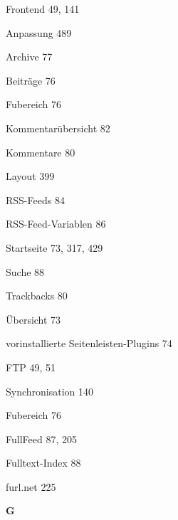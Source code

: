 \documentclass{book}
\renewcommand\indexspace{\vspace{11pt}}
\renewcommand\subitem{\par}
\begin{document}
\begin{multicols}{2}
\begin{osp-index}
  \item Frontend\hspace{1mm} 49, 141
    \subitem Anpassung\hspace{1mm} 489
    \subitem Archive\hspace{1mm} 77
    \subitem Beitr\"age\hspace{1mm} 76
    \subitem Fu\IeC {\ss }bereich\hspace{1mm} 76
    \subitem Kommentar\"ubersicht\hspace{1mm} 82
    \subitem Kommentare\hspace{1mm} 80
    \subitem Layout\hspace{1mm} 399
    \subitem RSS-Feeds\hspace{1mm} 84
    \subitem RSS-Feed-Variablen\hspace{1mm} 86
    \subitem Startseite\hspace{1mm} 73, 317, 429
    \subitem Suche\hspace{1mm} 88
    \subitem Trackbacks\hspace{1mm} 80
    \subitem \"Ubersicht\hspace{1mm} 73
    \subitem vorinstallierte Seitenleisten-Plugins\hspace{1mm} 74
  \item FTP\hspace{1mm} 49, 51
    \subitem Synchronisation\hspace{1mm} 140
  \item Fu\IeC {\ss }bereich\hspace{1mm} 76
  \item FullFeed\hspace{1mm} 87, 205
  \item Fulltext-Index\hspace{1mm} 88
  \item furl.net\hspace{1mm} 225

  \indexspace
{\sffamily\bfseries G}\nopagebreak


\end{osp-index}
\end{multicols}
\end{document}

